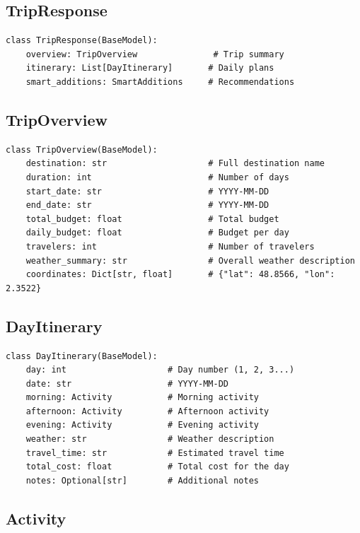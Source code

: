 \documentclass[12pt,a4paper]{report}
\begin{document}
\subsection{TripResponse}

\begin{lstlisting}[style=pythonstyle, caption={TripResponse Schema}]
class TripResponse(BaseModel):
    overview: TripOverview               # Trip summary
    itinerary: List[DayItinerary]       # Daily plans
    smart_additions: SmartAdditions     # Recommendations
\end{lstlisting}

\subsection{TripOverview}

\begin{lstlisting}[style=pythonstyle, caption={TripOverview Schema}]
class TripOverview(BaseModel):
    destination: str                    # Full destination name
    duration: int                       # Number of days
    start_date: str                     # YYYY-MM-DD
    end_date: str                       # YYYY-MM-DD
    total_budget: float                 # Total budget
    daily_budget: float                 # Budget per day
    travelers: int                      # Number of travelers
    weather_summary: str                # Overall weather description
    coordinates: Dict[str, float]       # {"lat": 48.8566, "lon": 2.3522}
\end{lstlisting}

\subsection{DayItinerary}

\begin{lstlisting}[style=pythonstyle, caption={DayItinerary Schema}]
class DayItinerary(BaseModel):
    day: int                    # Day number (1, 2, 3...)
    date: str                   # YYYY-MM-DD
    morning: Activity           # Morning activity
    afternoon: Activity         # Afternoon activity
    evening: Activity           # Evening activity
    weather: str                # Weather description
    travel_time: str            # Estimated travel time
    total_cost: float           # Total cost for the day
    notes: Optional[str]        # Additional notes
\end{lstlisting}

\subsection{Activity}
\end{document}
